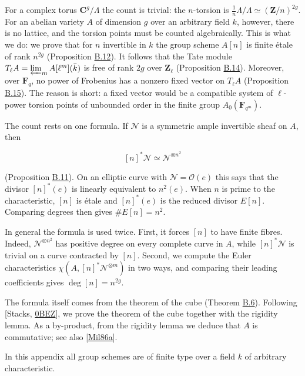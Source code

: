 \documentclass[11pt]{article}
\begin{document}
For a complex torus \(\mathbf C^g/\Lambda\) the count is trivial: the \(n\)-torsion is \(\tfrac1n\Lambda/\Lambda\simeq(\mathbf Z/n)^{2g}\). For an abelian variety \(A\) of dimension \(g\) over an arbitrary field \(k\), however, there is no lattice, and the torsion points must be counted algebraically. This is what we do: we prove that for \(n\) invertible in \(k\) the group scheme \(A[n]\) is finite étale of rank \(n^{2g}\) (Proposition \hyperref[bp108]{B.12}). It follows that the Tate module \(T_\ell A=\varprojlim_mA[\ell^m](\bar k)\) is free of rank \(2g\) over \(\mathbf Z_\ell\) (Proposition \hyperref[bp114]{B.14}). Moreover, over \(\mathbf F_q\), no power of Frobenius has a nonzero fixed vector on \(T_\ell A\) (Proposition \hyperref[bp117]{B.15}). The reason is short: a fixed vector would be a compatible system of \(\ell\)-power torsion points of unbounded order in the finite group \(A_0(\mathbf F_{q^m})\).

The count rests on one formula. If \(\mathcal N\) is a symmetric ample invertible sheaf on \(A\), then

\[
[n]^*\mathcal N\simeq\mathcal N^{\otimes n^2}
\]

(Proposition \hyperref[bp105]{B.11}). On an elliptic curve with \(\mathcal N=\mathcal O(e)\) this says that the divisor \([n]^*(e)\) is linearly equivalent to \(n^2(e)\). When \(n\) is prime to the characteristic, \([n]\) is étale and \([n]^*(e)\) is the reduced divisor \(E[n]\). Comparing degrees then gives \(\#E[n]=n^2\).

In general the formula is used twice. First, it forces \([n]\) to have finite fibres. Indeed, \(\mathcal N^{\otimes n^2}\) has positive degree on every complete curve in \(A\), while \([n]^*\mathcal N\) is trivial on a curve contracted by \([n]\). Second, we compute the Euler characteristics \(\chi(A,[n]^*\mathcal N^{\otimes m})\) in two ways, and comparing their leading coefficients gives \(\deg[n]=n^{2g}\).

The formula itself comes from the theorem of the cube (Theorem \hyperref[bp91]{B.6}). Following [Stacks, \href{https://stacks.math.columbia.edu/tag/0BEZ}{0BEZ}], we prove the theorem of the cube together with the rigidity lemma. As a by-product, from the rigidity lemma we deduce that \(A\) is commutative; see also [\hyperref[bp349]{Mil86a}].

In this appendix all group schemes are of finite type over a field \(k\) of arbitrary characteristic.

\end{document}

